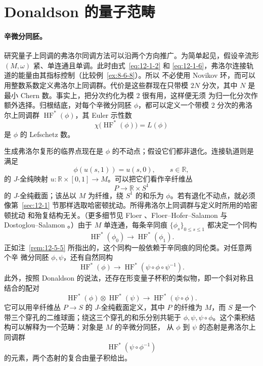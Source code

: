 
\section{Donaldson 的量子范畴}\label{sec:12-6}

\paragraph{辛微分同胚。}
研究量子上同调的弗洛尔同调方法可以沿两个方向推广。为简单起见，假设辛流形
$(M,\omega)$ 紧、单连通且单调。此时由式~\eqref{eq:12-1-2} 和
\eqref{eq:12-1-6}，弗洛尔连接轨道的能量由其指标控制（比较例~\ref{ex:8-6-8}）。所以
不必使用 Novikov 环，而可以用整数系数定义弗洛尔上同调群。代价是这些群现在只带模
$2N$ 分次，其中 $N$ 是最小 Chern 数。事实上，把分次约化为模 $2$ 很有用，这样便无须
为归一化分次作额外选择。归根结底，对每个辛微分同胚 $\phi$，都可以定义一个带模 $2$
分次的弗洛尔上同调群 $\operatorname{HF}^*(\phi)$，其 Euler 示性数
\[
  \chi\bigl(\operatorname{HF}^*(\phi)\bigr)=L(\phi)
\]
是 $\phi$ 的 Lefschetz 数。

生成弗洛尔复形的临界点现在是 $\phi$ 的不动点；假设它们都非退化。连接轨道则是满足
\[
  \phi(u(s,1))=u(s,0),\qquad s\in\mathbb R,
\]
的 $J$-全纯映射 $u:\mathbb R\times[0,1]\to M$。可以把它们看作辛纤维丛
\[
  P\longrightarrow\mathbb R\times S^1
\]
的 $J$-全纯截面；该丛以 $M$ 为纤维，绕 $S^1$ 的和乐为 $\phi$。若有退化不动点，就必须
像第~\ref{sec:12-1} 节那样选取哈密顿扰动。所得弗洛尔上同调群与定义时所用的哈密顿扰动
和殆复结构无关。（更多细节见 Floer 、Floer--Hofer--Salamon
 与 Dostoglou--Salamon 。）由于 $M$ 单连通，每条辛同痕
$\{\phi_s\}_{0\leq s\leq1}$ 都决定一个同构
\[
  \operatorname{HF}^*(\phi_0)\longrightarrow\operatorname{HF}^*(\phi_1).
\]
正如注~\ref{rem:12-5-5} 所指出的，这个同构一般依赖于辛同痕的同伦类。对任意两个辛
微分同胚 $\phi,\psi$，还有自然同构
\[
  \operatorname{HF}^*(\phi)
  \longrightarrow
  \operatorname{HF}^*(\psi\circ\phi\circ\psi^{-1}).
\]
此外，按照 Donaldson 的说法，还存在形变量子杯积的类似物，即一个斜对称且结合的配对
\[
  \operatorname{HF}^*(\phi)\otimes\operatorname{HF}^*(\psi)
  \longrightarrow
  \operatorname{HF}^*(\psi\circ\phi).
\]
它可以用辛纤维丛 $P\to S$ 的 $J$-全纯截面定义，其中 $P$ 的纤维为 $M$，而 $S$ 是一个
带三个穿孔的二维球面；绕这三个穿孔的和乐分别共轭于
$\phi,\psi,\psi\circ\phi$。这个乘积结构可以解释为一个范畴：对象是 $M$ 的辛微分同胚，
从 $\phi$ 到 $\psi$ 的态射是弗洛尔上同调群
\[
  \operatorname{HF}^*(\psi\circ\phi^{-1})
\]
的元素，两个态射的复合由量子积给出。

